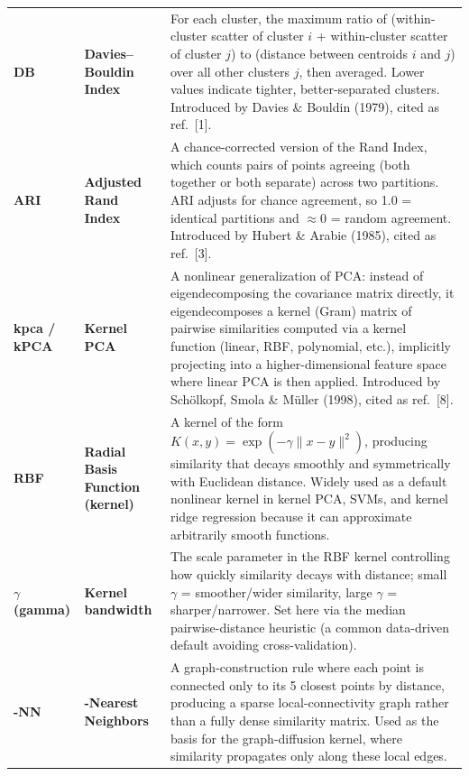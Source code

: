 \documentclass[11pt]{article}
\newcommand{\glossaryhighlight}[1]{\textbf{\boldmath#1}}
\begin{document}
\begin{longtable}{P{2cm} P{3cm} P{11cm}}
\glossaryhighlight{DB} & \glossaryhighlight{Davies--Bouldin Index} &
For each cluster, the maximum ratio of (within-cluster scatter of cluster $i$ + within-cluster scatter of cluster $j$) to (distance between centroids $i$ and $j$) over all other clusters $j$, then averaged. Lower values indicate tighter, better-separated clusters. Introduced by Davies \& Bouldin (1979), cited as ref.~[1]. \\

\glossaryhighlight{ARI} & \glossaryhighlight{Adjusted Rand Index} &
A chance-corrected version of the Rand Index, which counts pairs of points agreeing (both together or both separate) across two partitions. ARI adjusts for chance agreement, so 1.0 = identical partitions and $\approx$0 = random agreement. Introduced by Hubert \& Arabie (1985), cited as ref.~[3]. \\

\glossaryhighlight{kpca / kPCA} & \glossaryhighlight{Kernel PCA} &
A nonlinear generalization of PCA: instead of eigendecomposing the covariance matrix directly, it eigendecomposes a kernel (Gram) matrix of pairwise similarities computed via a kernel function (linear, RBF, polynomial, etc.), implicitly projecting into a higher-dimensional feature space where linear PCA is then applied. Introduced by Sch\"olkopf, Smola \& M\"uller (1998), cited as ref.~[8]. \\

\glossaryhighlight{RBF} & \glossaryhighlight{Radial Basis Function (kernel)} &
A kernel of the form $K(x,y) = \exp(-\gamma\lVert x-y \rVert^2)$, producing similarity that decays smoothly and symmetrically with Euclidean distance. Widely used as a default nonlinear kernel in kernel PCA, SVMs, and kernel ridge regression because it can approximate arbitrarily smooth functions. \\

\glossaryhighlight{$\gamma$ (gamma)} & \glossaryhighlight{Kernel bandwidth} &
The scale parameter in the RBF kernel controlling how quickly similarity decays with distance; small $\gamma$ = smoother/wider similarity, large $\gamma$ = sharper/narrower. Set here via the median pairwise-distance heuristic (a common data-driven default avoiding cross-validation). \\

\glossaryhighlight{5-NN} & \glossaryhighlight{5-Nearest Neighbors} &
A graph-construction rule where each point is connected only to its 5 closest points by distance, producing a sparse local-connectivity graph rather than a fully dense similarity matrix. Used as the basis for the graph-diffusion kernel, where similarity propagates only along these local edges. \\


\end{longtable}
\end{document}
